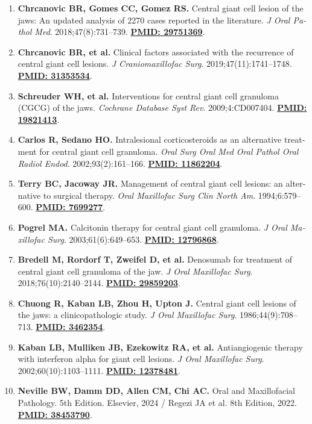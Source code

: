 \documentclass[a4paper]{article}
\begin{document}
\begin{latin}
\small
\begin{enumerate}
    \item \textbf{Chrcanovic BR, Gomes CC, Gomez RS.} Central giant cell lesion of the jaws: An updated analysis of 2270 cases reported in the literature. \textit{J Oral Pathol Med}. 2018;47(8):731--739. \href{https://pubmed.ncbi.nlm.nih.gov/29751369/}{\textbf{PMID: 29751369}}.
    \item \textbf{Chrcanovic BR, et al.} Clinical factors associated with the recurrence of central giant cell lesions. \textit{J Craniomaxillofac Surg}. 2019;47(11):1741--1748. \href{https://pubmed.ncbi.nlm.nih.gov/31353534/}{\textbf{PMID: 31353534}}.
    \item \textbf{Schreuder WH, et al.} Interventions for central giant cell granuloma (CGCG) of the jaws. \textit{Cochrane Database Syst Rev}. 2009;4:CD007404. \href{https://pubmed.ncbi.nlm.nih.gov/19821413/}{\textbf{PMID: 19821413}}.
    \item \textbf{Carlos R, Sedano HO.} Intralesional corticosteroids as an alternative treatment for central giant cell granuloma. \textit{Oral Surg Oral Med Oral Pathol Oral Radiol Endod}. 2002;93(2):161--166. \href{https://pubmed.ncbi.nlm.nih.gov/11862204/}{\textbf{PMID: 11862204}}.
    \item \textbf{Terry BC, Jacoway JR.} Management of central giant cell lesions: an alternative to surgical therapy. \textit{Oral Maxillofac Surg Clin North Am}. 1994;6:579--600. \href{https://pubmed.ncbi.nlm.nih.gov/7699277/}{\textbf{PMID: 7699277}}.
    \item \textbf{Pogrel MA.} Calcitonin therapy for central giant cell granuloma. \textit{J Oral Maxillofac Surg}. 2003;61(6):649--653. \href{https://pubmed.ncbi.nlm.nih.gov/12796868/}{\textbf{PMID: 12796868}}.
    \item \textbf{Bredell M, Rordorf T, Zweifel D, et al.} Denosumab for treatment of central giant cell granuloma of the jaw. \textit{J Oral Maxillofac Surg}. 2018;76(10):2140--2144. \href{https://pubmed.ncbi.nlm.nih.gov/29859203/}{\textbf{PMID: 29859203}}.
    \item \textbf{Chuong R, Kaban LB, Zhou H, Upton J.} Central giant cell lesions of the jaws: a clinicopathologic study. \textit{J Oral Maxillofac Surg}. 1986;44(9):708--713. \href{https://pubmed.ncbi.nlm.nih.gov/3462354/}{\textbf{PMID: 3462354}}.
    \item \textbf{Kaban LB, Mulliken JB, Ezekowitz RA, et al.} Antiangiogenic therapy with interferon alpha for giant cell lesions. \textit{J Oral Maxillofac Surg}. 2002;60(10):1103--1111. \href{https://pubmed.ncbi.nlm.nih.gov/12378481/}{\textbf{PMID: 12378481}}.
    \item \textbf{Neville BW, Damm DD, Allen CM, Chi AC.} Oral and Maxillofacial Pathology. 5th Edition. Elsevier, 2024 / Regezi JA et al. 8th Edition, 2022. \href{https://pubmed.ncbi.nlm.nih.gov/38453790/}{\textbf{PMID: 38453790}}.
\end{enumerate}
\end{latin}
\end{document}
